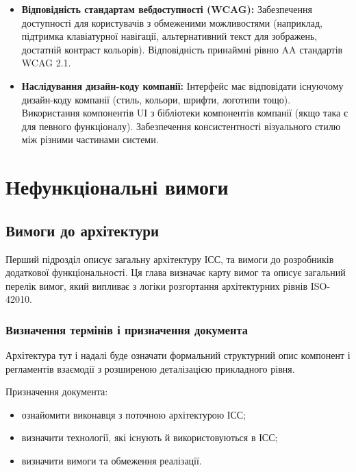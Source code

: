 \documentclass{article}
\begin{document}
\begin{itemize}
    \item \textbf{Відповідність стандартам вебдоступності (WCAG):} Забезпечення доступності для
           користувачів з обмеженими можливостями (наприклад, підтримка клавіатурної навігації,
           альтернативний текст для зображень, достатній контраст кольорів). Відповідність принаймні рівню AA стандартів WCAG 2.1.
    \item \textbf{Наслідування дизайн-коду компанії:} Інтерфейс має відповідати існуючому дизайн-коду
           компанії (стиль, кольори, шрифти, логотипи тощо). Використання компонентів UI з бібліотеки
           компонентів компанії (якщо така є для певного функціоналу). Забезпечення консистентності
           візуального стилю між різними частинами системи.
\end{itemize}

\newpage
\section{Нефункціональні вимоги}

\subsection{Вимоги до архітектури}

Перший підрозділ описує загальну архітектуру ІСС, та вимоги до розробників додаткової функціональності.
Ця глава визначає карту вимог та описує загальний перелік вимог, який випливає з логіки розгортання
архітектурних рівнів ISO-42010.

\subsubsection{Визначення термінів і призначення документа}

Архітектура тут і надалі буде означати формальний структурний опис компонент і регламентів взаємодії з розширеною деталізацією прикладного рівня.

Призначення документа:
\begin{itemize}
  \item ознайомити виконавця з поточною архітектурою ІСС;
  \item визначити технології, які існують й використовуються в ІСС;
  \item визначити вимоги та обмеження реалізації.
\end{itemize}
\end{document}
